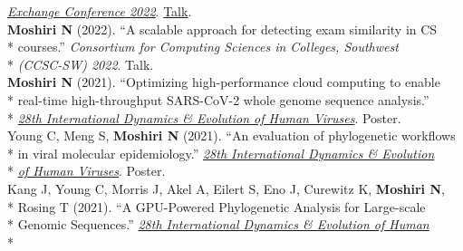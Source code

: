 \documentclass[margin,line]{res}
\begin{document}
\begin{resume}
\hspace*{8mm} \href{https://publichealth.sdsu.edu/epiexchange}{\textit{Exchange Conference 2022}}. \href{https://docs.google.com/document/d/e/2PACX-1vTufgGn-94tzBuzs1MXideQPxZApXW0EvSHIyfKQX8xdXPvwVo1H3C4WbWSgmp67BbERnjzc_tkYqdm/pub}{Talk}.\\
\hspace*{4mm} \textbf{Moshiri N} (2022). ``A scalable approach for detecting exam similarity in CS\\*
\hspace*{9mm} courses.'' \textit{Consortium for Computing Sciences in Colleges, Southwest}\\*\vspace{2mm}
\hspace*{8mm} \textit{(CCSC-SW) 2022}. Talk.\\
\hspace*{4mm} \textbf{Moshiri N} (2021). ``Optimizing high-performance cloud computing to enable\\*
\hspace*{9mm} real-time high-throughput SARS-CoV-2 whole genome sequence analysis.''\\*\vspace{2mm}
\hspace*{8mm} \href{https://cpd.ucsd.edu/hivdynamics/}{\textit{28th International Dynamics \& Evolution of Human Viruses}}. Poster.\\
\hspace*{4mm} Young C, Meng S, \textbf{Moshiri N} (2021). ``An evaluation of phylogenetic workflows\\*
\hspace*{9mm} in viral molecular epidemiology.'' \href{https://cpd.ucsd.edu/hivdynamics/}{\textit{28th International Dynamics \& Evolution}}\\*\vspace{2mm}
\hspace*{8mm} \href{https://cpd.ucsd.edu/hivdynamics/}{\textit{of Human Viruses}}. Poster.\\
\hspace*{4mm} Kang J, Young C, Morris J, Akel A, Eilert S, Eno J, Curewitz K, \textbf{Moshiri N},\\*
\hspace*{9mm}  Rosing T (2021). ``A GPU-Powered Phylogenetic Analysis for Large-scale\\*
\hspace*{9.5mm} Genomic Sequences.'' \href{https://cpd.ucsd.edu/hivdynamics/}{\textit{28th International Dynamics \& Evolution of Human}}\\*\vspace{2mm}

\end{resume}
\end{document}
